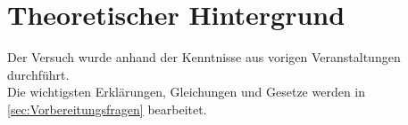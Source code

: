 \section{Theoretischer Hintergrund}
Der Versuch wurde anhand der Kenntnisse aus vorigen Veranstaltungen durchführt.\\
Die wichtigsten Erklärungen, Gleichungen und Gesetze werden in \autoref{sec:Vorbereitungsfragen}
bearbeitet.\\
